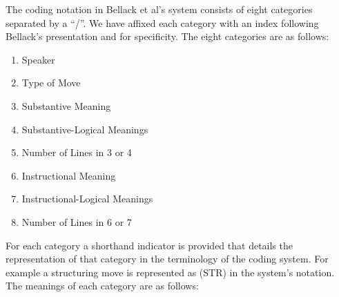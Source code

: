\documentclass[conference]{IEEEtran}
\begin{document}
The coding notation in Bellack et al's system consists of eight categories
separated by a ``/''. We have affixed each category with an index following
Bellack's presentation and for specificity. The eight categories are as follows:

\begin{enumerate}
  \item Speaker
  \item Type of Move
  \item Substantive Meaning
  \item Substantive-Logical Meanings
  \item Number of Lines in 3 or 4
  \item Instructional Meaning
  \item Instructional-Logical Meanings
  \item Number of Lines in 6 or 7
\end{enumerate}

For each category a shorthand indicator is provided that details the
representation of that category in the terminology of the coding system.
For example a structuring move is represented as (STR) in the system's
notation. The meanings of each category are as follows:
\end{document}
